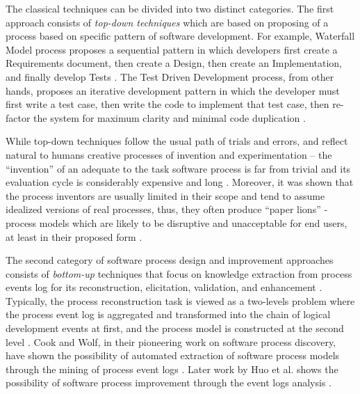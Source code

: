 The classical techniques can be divided into two distinct categories. 
The first approach consists of \textit{top-down techniques} which are based on proposing of a process 
based on specific pattern of software development. 
For example, Waterfall Model process proposes a sequential pattern in which developers first create a 
Requirements document, then create a Design, then create an Implementation, and finally develop Tests 
\cite{citeulike:9982731}. 
The Test Driven Development process, from other hands, proposes an iterative development pattern in which
the developer must first write a test case, then write the code to implement that test case, then re-factor the 
system for maximum clarity and minimal code duplication \cite{citeulike:6086365}. 

While top-down techniques follow the usual path of trials and errors, and reflect natural to 
humans creative processes of invention and experimentation -- the ``invention'' of an adequate to 
the task software process is far from trivial and its evaluation cycle is considerably expensive 
and long \cite{citeulike:5043104} \cite{citeulike:1986013}.
Moreover, it was shown that the process inventors are usually limited in their scope and tend to 
assume idealized versions of real processes, thus, they often produce ``paper lions'' - process 
models which are likely to be disruptive and unacceptable for end users, 
at least in their proposed form \cite{citeulike:9758924}.

The second category of software process design and improvement approaches consists of 
\textit{bottom-up} techniques that focus on knowledge extraction from process events log for 
its reconstruction, elicitation, validation, and enhancement \cite{citeulike:12944447}. 
Typically, the process reconstruction task is viewed as a two-levels problem where the process 
event log is aggregated and transformed into the chain of logical development events at first, 
and the process model is constructed at the second level \cite{citeulike:2703162} \cite{citeulike:12944447}.
Cook and Wolf, in their pioneering work on software process discovery, have shown the possibility of 
automated extraction of software process models through the mining of process event logs 
\cite{citeulike:328044} \cite{citeulike:5120757} \cite{citeulike:5128143}. 
Later work by Huo et al. shows the possibility of software process improvement through the event 
logs analysis \cite{citeulike:7691059} \cite{citeulike:7690766}. 

